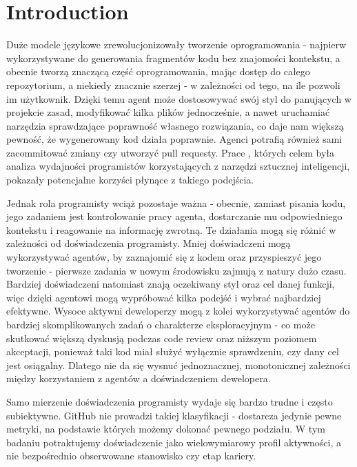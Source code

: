 \section{Introduction}\label{sec:introduction}

Duże modele językowe zrewolucjonizowały tworzenie oprogramowania - najpierw wykorzystywane do generowania fragmentów kodu bez znajomości kontekstu, a obecnie tworzą znaczącą część oprogramowania, mając dostęp do całego repozytorium, a niekiedy znacznie szerzej - w zależności od tego, na ile pozwoli im użytkownik. Dzięki temu agent może dostosowywać swój styl do panujących w projekcie zasad, modyfikować kilka plików jednocześnie, a nawet uruchamiać narzędzia sprawdzające poprawność własnego rozwiązania, co daje nam większą pewność, że wygenerowany kod działa poprawnie. Agenci potrafią również sami zacommitować zmiany czy utworzyć pull requesty. Prace \cite{barke2023grounded,peng2023impact}, których celem była analiza wydajności programistów korzystających z narzędzi sztucznej inteligencji, pokazały potencjalne korzyści płynące z takiego podejścia.

Jednak rola programisty wciąż pozostaje ważna - obecnie, zamiast pisania kodu, jego zadaniem jest kontrolowanie pracy agenta, dostarczanie mu odpowiedniego kontekstu i reagowanie na informację zwrotną. Te działania mogą się różnić w zależności od doświadczenia programisty. Mniej doświadczeni mogą wykorzystywać agentów, by zaznajomić się z kodem oraz przyspieszyć jego tworzenie - pierwsze zadania w nowym środowisku zajmują z natury dużo czasu. Bardziej doświadczeni natomiast znają oczekiwany styl oraz cel danej funkcji, więc dzięki agentowi mogą wypróbować kilka podejść i wybrać najbardziej efektywne. Wysoce aktywni deweloperzy mogą z kolei wykorzystywać agentów do bardziej skomplikowanych zadań o charakterze eksploracyjnym - co może skutkować większą dyskusją podczas code review oraz niższym poziomem akceptacji, ponieważ taki kod miał służyć wyłącznie sprawdzeniu, czy dany cel jest osiągalny. Dlatego nie da się wysnuć jednoznacznej, monotonicznej zależności między korzystaniem z agentów a doświadczeniem dewelopera.

Samo mierzenie doświadczenia programisty wydaje się bardzo trudne i często subiektywne. GitHub nie prowadzi takiej klasyfikacji - dostarcza jedynie pewne metryki, na podstawie których możemy dokonać pewnego podziału. W tym badaniu potraktujemy doświadczenie jako wielowymiarowy profil aktywności, a nie bezpośrednio obserwowane stanowisko czy etap kariery.

